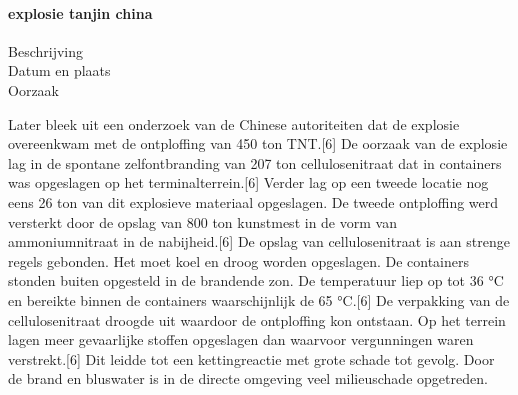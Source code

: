 \paragraph{explosie tanjin china }

\begin{description}
\item[Beschrijving]
\item[Datum en plaats] 
\item[Oorzaak]
\end{description}

Later bleek uit een onderzoek van de Chinese autoriteiten dat de explosie overeenkwam met de ontploffing van 450 ton TNT.[6] 
De oorzaak van de explosie lag in de spontane zelfontbranding van 207 ton cellulosenitraat dat in containers was opgeslagen op het terminalterrein.[6] 
Verder lag op een tweede locatie nog eens 26 ton van dit explosieve materiaal opgeslagen.
De tweede ontploffing werd versterkt door de opslag van 800 ton kunstmest in de vorm van ammoniumnitraat in de nabijheid.[6]
De opslag van cellulosenitraat is aan strenge regels gebonden. Het moet koel en droog worden opgeslagen. De containers stonden buiten opgesteld in de brandende zon. De temperatuur liep op tot 36 °C en bereikte binnen de containers waarschijnlijk de 65 °C.[6] De verpakking van de cellulosenitraat droogde uit waardoor de ontploffing kon ontstaan. Op het terrein lagen meer gevaarlijke stoffen opgeslagen dan waarvoor vergunningen waren verstrekt.[6] Dit leidde tot een kettingreactie met grote schade tot gevolg. Door de brand en bluswater is in de directe omgeving veel milieuschade opgetreden.


